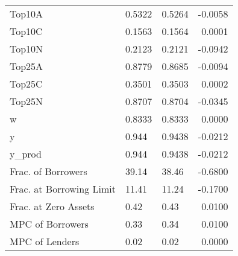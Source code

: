 \begin{table}
\begin{tabular}{lllr}
                  Top10A &  0.5322 &   0.5264 &  -0.0058 \\
                  Top10C &  0.1563 &   0.1564 &   0.0001 \\
                  Top10N &  0.2123 &   0.2121 &  -0.0942 \\
                  Top25A &  0.8779 &   0.8685 &  -0.0094 \\
                  Top25C &  0.3501 &   0.3503 &   0.0002 \\
                  Top25N &  0.8707 &   0.8704 &  -0.0345 \\
                       w &  0.8333 &   0.8333 &   0.0000 \\
                       y &   0.944 &   0.9438 &  -0.0212 \\
                  y\_prod &   0.944 &   0.9438 &  -0.0212 \\
      Frac. of Borrowers &   39.14 &    38.46 &  -0.6800 \\
Frac. at Borrowing Limit &   11.41 &    11.24 &  -0.1700 \\
    Frac. at Zero Assets &    0.42 &     0.43 &   0.0100 \\
        MPC of Borrowers &    0.33 &     0.34 &   0.0100 \\
          MPC of Lenders &    0.02 &     0.02 &   0.0000 \\
\bottomrule
\end{tabular}
\end{table}

